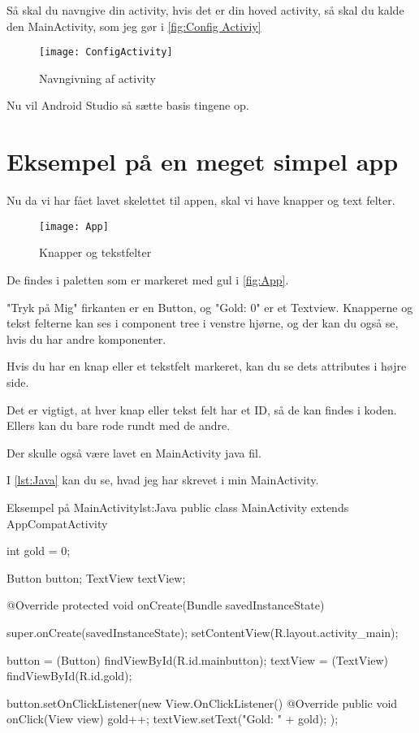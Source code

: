 Så skal du navngive din activity, hvis det er din hoved activity, så skal du kalde den MainActivity, som jeg gør i \autoref{fig:Config Activiy} 

\begin{figure}[h]
	\texttt{[image: ConfigActivity]}
	\caption{Navngivning af activity}
	\label{fig:Config Activiy}
\end{figure}

Nu vil Android Studio så sætte basis tingene op.

\FloatBarrier

\section{Eksempel på en meget simpel app}

Nu da vi har fået lavet skelettet til appen, skal vi have knapper og text felter.

\begin{figure}[h]
	\texttt{[image: App]}
	\caption{Knapper og tekstfelter}
	\label{fig:App}
\end{figure}

De findes i paletten som er markeret med gul i \autoref{fig:App}. 

"Tryk på Mig" firkanten er en Button, og "Gold: 0" er et Textview. 
Knapperne og tekst felterne kan ses i component tree i venstre hjørne, og der kan du også se, hvis du har andre komponenter.

Hvis du har en knap eller et tekstfelt markeret, kan du se dets attributes i højre side.

Det er vigtigt, at hver knap eller tekst felt har et ID, så de kan findes i koden. Ellers kan du bare rode rundt med de andre. 

Der skulle også være lavet en MainActivity java fil.

I \autoref{lst:Java} kan du se, hvad jeg har skrevet i min MainActivity. 

\begin{JavaCode}{Eksempel på MainActivity}{lst:Java}
	public class MainActivity extends AppCompatActivity {
		int gold = 0;
		
		Button button;
		TextView textView;
		
		@Override
		protected void onCreate(Bundle savedInstanceState) {
			super.onCreate(savedInstanceState);
			setContentView(R.layout.activity_main);
			
			button = (Button) findViewById(R.id.mainbutton);
			textView = (TextView) findViewById(R.id.gold);
			
			button.setOnClickListener(new View.OnClickListener() {
				@Override
				public void onClick(View view) {
					gold++;
					textView.setText("Gold: " + gold);	
				}
			});
		}
	}
\end{JavaCode}

